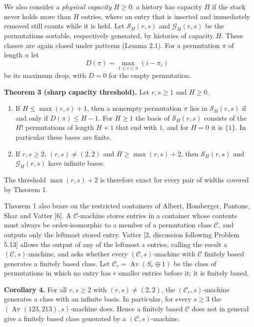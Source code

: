 \documentclass[11pt,letterpaper]{article}
\begin{document}
We also consider a \emph{physical capacity} \(H\ge0\): a history has
capacity \(H\) if the stack never holds more than \(H\) entries, where
an entry that is inserted and immediately removed still counts while it
is held. Let \(\mathcal S_H(r,s)\) and \(\mathcal G_H(r,s)\) be the
permutations sortable, respectively generated, by histories of capacity
\(H\). These classes are again closed under patterns (Lemma 2.1). For a
permutation \(\pi\) of length \(n\) let
\[D(\pi)=\max_{1\le i\le n}(i-\pi_i)\] be its maximum drop, with \(D=0\)
for the empty permutation.

\textbf{Theorem 3 (sharp capacity threshold).} Let \(r,s\ge1\) and
\(H\ge0\).

\begin{enumerate}
\def\labelenumi{(\alph{enumi})}
\item
  If \(H\le\max(r,s)+1\), then a nonempty permutation \(\pi\) lies in
  \(\mathcal S_H(r,s)\) if and only if \(D(\pi)\le H-1\). For \(H\ge1\)
  the basis of \(\mathcal S_H(r,s)\) consists of the \(H!\) permutations
  of length \(H+1\) that end with \(1\), and for \(H=0\) it is
  \(\{1\}\). In particular these bases are finite.
\item
  If \(r,s\ge2\), \((r,s)\ne(2,2)\) and \(H\ge\max(r,s)+2\), then
  \(\mathcal S_H(r,s)\) and \(\mathcal G_H(r,s)\) have infinite bases.
\end{enumerate}

The threshold \(\max(r,s)+2\) is therefore exact for every pair of
widths covered by Theorem 1.

Theorem 1 also bears on the restricted containers of Albert, Homberger,
Pantone, Shar and Vatter {[}6{]}. A \(\mathcal C\)-machine stores
entries in a container whose contents must always be order-isomorphic to
a member of a permutation class \(\mathcal C\), and outputs only the
leftmost stored entry. Vatter {[}2, discussion following Problem 5.13{]}
allows the output of any of the leftmost \(s\) entries, calling the
result a \((\mathcal C,s)\)-machine, and asks whether every
\((\mathcal C,s)\)-machine with \(\mathcal C\) finitely based generates
a finitely based class. Let
\(\mathcal C_r=\operatorname{Av}(S_r\oplus1)\) be the class of
permutations in which no entry has \(r\) smaller entries before it; it
is finitely based.

\textbf{Corollary 4.} For all \(r,s\ge2\) with \((r,s)\ne(2,2)\), the
\((\mathcal C_r,s)\)-machine generates a class with an infinite basis.
In particular, for every \(s\ge3\) the
\((\operatorname{Av}(123,213),s)\)-machine does. Hence a finitely based
\(\mathcal C\) does not in general give a finitely based class generated
by a \((\mathcal C,s)\)-machine.
\end{document}

